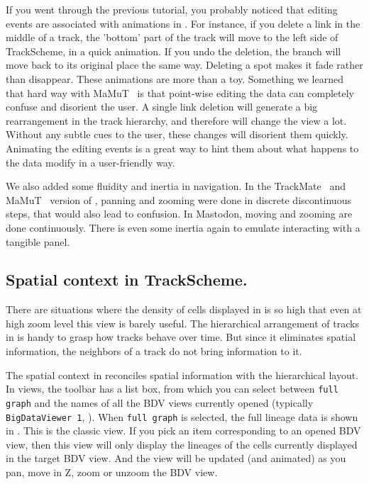 If you went through the previous tutorial, you probably noticed that editing events are associated with animations in \TrackScheme.
For instance, if you delete a link in the middle of a track, the 'bottom' part of the track will move to the left side of TrackScheme, in a quick animation.
If you undo the deletion, the branch will move back to its original place the same way. 
Deleting a spot makes it fade rather than disappear.
These animations are more than a toy.
Something we learned that hard way with MaMuT~\cite{MaMuT} is that point-wise editing the data can completely confuse and disorient the user.
A single link deletion will generate a big rearrangement in the track hierarchy, and therefore will change the \TrackScheme view a lot. 
Without any subtle cues to the user, these changes will disorient them quickly.
Animating the editing events is a great way to hint them about what happens to the data modify in a user-friendly way.

We also added some fluidity and inertia in \TrackScheme navigation. 
In the TrackMate~\cite{TrackMate} and MaMuT~\cite{MaMuT} version of \TrackScheme, panning and zooming were done in discrete discontinuous steps, that would also lead to confusion.
In Mastodon, moving and zooming are done continuously. 
There is even some inertia again to emulate interacting with a tangible panel.



\subsection{Spatial context in TrackScheme.}

There are situations where the density of cells displayed in \TrackScheme is so high that even at high zoom level this view is barely useful. 
The hierarchical arrangement of tracks in \TrackScheme is handy to grasp how tracks behave over time.
But since it eliminates spatial information, the neighbors of a track do not bring information to it.

The spatial context in \TrackScheme reconciles spatial information with the hierarchical layout. 
In \TrackScheme views, the toolbar has a  list box, from which you can select between \texttt{full graph} and the names of all the BDV views currently opened (typically \texttt{BigDataViewer 1}, \etc).
When \texttt{full graph} is selected, the full lineage data is shown in \TrackScheme. 
This is the classic view.
If you pick an item corresponding to an opened BDV view, then this \TrackScheme view will only display the lineages of the cells currently displayed in the target BDV view. 
And the \TrackScheme view will be updated (and animated) as you pan, move in Z, zoom or unzoom the BDV view. 

